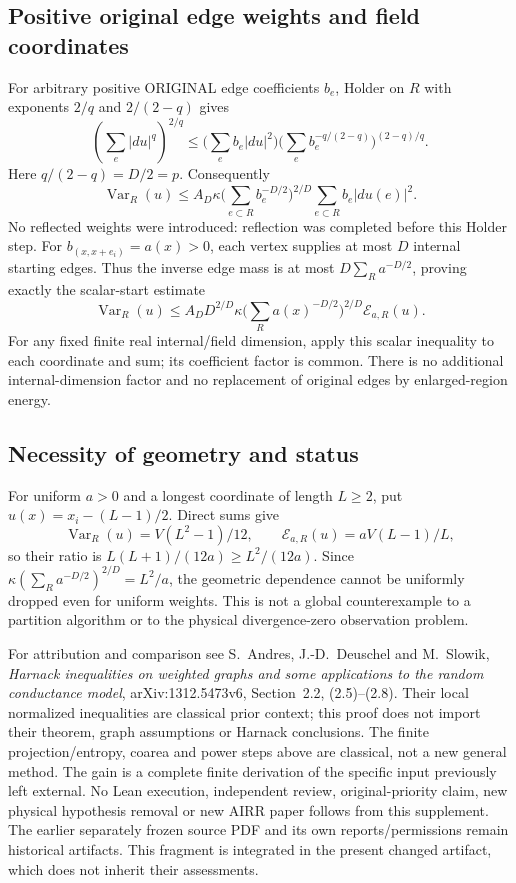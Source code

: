 \subsection{Positive original edge weights and field coordinates}
For arbitrary positive ORIGINAL edge coefficients $b_e$, Holder on $R$
with exponents $2/q$ and $2/(2-q)$ gives
\[
 \left(\sum_e|du|^q\right)^{2/q}
 \leq\Big(\sum_e b_e|du|^2\Big)
 \Big(\sum_e b_e^{-q/(2-q)}\Big)^{(2-q)/q}.
\]
Here $q/(2-q)=D/2=p$. Consequently
\begin{equation}\label{eq:rectangle-weighted-derived}
 \operatorname{Var}_R(u)\leq A_D\kappa
 \Big(\sum_{e\subset R}b_e^{-D/2}\Big)^{2/D}
 \sum_{e\subset R}b_e|du(e)|^2.
\end{equation}
No reflected weights were introduced: reflection was completed before
this Holder step. For $b_{(x,x+e_i)}=a(x)>0$, each vertex supplies at most
$D$ internal starting edges. Thus the inverse edge mass is at most
$D\sum_Ra^{-D/2}$, proving exactly the scalar-start estimate
\[
 \operatorname{Var}_R(u)\leq A_D D^{2/D}\kappa
 \Big(\sum_Ra(x)^{-D/2}\Big)^{2/D}\mathcal E_{a,R}(u).
\]
For any fixed finite real internal/field dimension, apply this scalar
inequality to each coordinate and sum; its coefficient factor is common.
There is no additional internal-dimension factor and no replacement of
original edges by enlarged-region energy.

\subsection{Necessity of geometry and status}
For uniform $a>0$ and a longest coordinate of length $L\geq2$, put
$u(x)=x_i-(L-1)/2$. Direct sums give
\[
 \operatorname{Var}_R(u)=V(L^2-1)/12,\qquad
 \mathcal E_{a,R}(u)=aV(L-1)/L,
\]
so their ratio is $L(L+1)/(12a)\geq L^2/(12a)$. Since
$\kappa(\sum_Ra^{-D/2})^{2/D}=L^2/a$, the geometric dependence cannot
be uniformly dropped even for uniform weights. This is not a global
counterexample to a partition algorithm or to the physical divergence-zero
observation problem.

For attribution and comparison see S.~Andres, J.-D.~Deuschel and M.~Slowik,
\emph{Harnack inequalities on weighted graphs and some applications to the
random conductance model}, arXiv:1312.5473v6, Section~2.2, (2.5)--(2.8).
Their local normalized inequalities are classical prior context; this
proof does not import their theorem, graph assumptions or Harnack conclusions.
The finite projection/entropy, coarea and power steps above are classical,
not a new general method. The gain is a complete finite derivation of the
specific input previously left external. No Lean execution, independent
review, original-priority claim, new physical hypothesis removal or new
AIRR paper follows from this supplement. The earlier separately frozen source PDF and its own reports/permissions
remain historical artifacts. This fragment is integrated in the present
changed artifact, which does not inherit their assessments.
